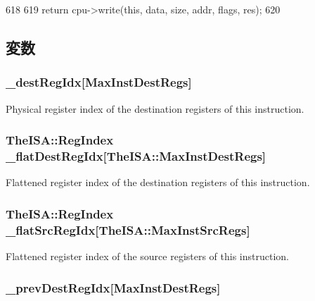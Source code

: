 \begin{DoxyCode}
618 {
619     return cpu->write(this, data, size, addr, flags, res);
620 }
\end{DoxyCode}


\subsection{変数}
\hypertarget{classInOrderDynInst_aab81c62ecc0c9bae628449fc2875a2e3}{
\subsubsection[{\_\-destRegIdx}]{ {\bf \_\-destRegIdx}\mbox{[}MaxInstDestRegs\mbox{]}}}
\label{classInOrderDynInst_aab81c62ecc0c9bae628449fc2875a2e3}
Physical register index of the destination registers of this instruction. \hypertarget{classInOrderDynInst_a44085d1f8566ca30fef0c6787999c79b}{
\subsubsection[{\_\-flatDestRegIdx}]{\setlength{\rightskip}{0pt plus 5cm}TheISA::RegIndex {\bf \_\-flatDestRegIdx}\mbox{[}TheISA::MaxInstDestRegs\mbox{]}}}
\label{classInOrderDynInst_a44085d1f8566ca30fef0c6787999c79b}
Flattened register index of the destination registers of this instruction. \hypertarget{classInOrderDynInst_a4b49f0a3efb36ac8c8e0de99b9ea33cc}{
\subsubsection[{\_\-flatSrcRegIdx}]{\setlength{\rightskip}{0pt plus 5cm}TheISA::RegIndex {\bf \_\-flatSrcRegIdx}\mbox{[}TheISA::MaxInstSrcRegs\mbox{]}}}
\label{classInOrderDynInst_a4b49f0a3efb36ac8c8e0de99b9ea33cc}
Flattened register index of the source registers of this instruction. \hypertarget{classInOrderDynInst_a11e21e74ba2438f42d888b1e80d6de27}{
\subsubsection[{\_\-prevDestRegIdx}]{ {\bf \_\-prevDestRegIdx}\mbox{[}MaxInstDestRegs\mbox{]}}}
